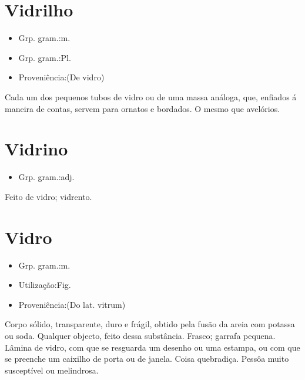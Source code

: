 \documentclass{article}
\begin{document}
\section{Vidrilho}
\begin{itemize}
\item {Grp. gram.:m.}
\end{itemize}
\begin{itemize}
\item {Grp. gram.:Pl.}
\end{itemize}
\begin{itemize}
\item {Proveniência:(De \textunderscore vidro\textunderscore )}
\end{itemize}
Cada um dos pequenos tubos de vidro ou de uma massa análoga, que, enfiados á maneira de contas, servem para ornatos e bordados.
O mesmo que \textunderscore avelórios\textunderscore .
\section{Vidrino}
\begin{itemize}
\item {Grp. gram.:adj.}
\end{itemize}
Feito de vidro; vidrento.
\section{Vidro}
\begin{itemize}
\item {Grp. gram.:m.}
\end{itemize}
\begin{itemize}
\item {Utilização:Fig.}
\end{itemize}
\begin{itemize}
\item {Proveniência:(Do lat. \textunderscore vitrum\textunderscore )}
\end{itemize}
Corpo sólido, transparente, duro e frágil, obtido pela fusão da areia com potassa ou soda.
Qualquer objecto, feito dessa substância.
Frasco; garrafa pequena.
Lâmina de vidro, com que se resguarda um desenho ou uma estampa, ou com que se preenche um caixilho de porta ou de janela.
Coisa quebradiça.
Pessôa muito susceptível ou melindrosa.
\end{document}
